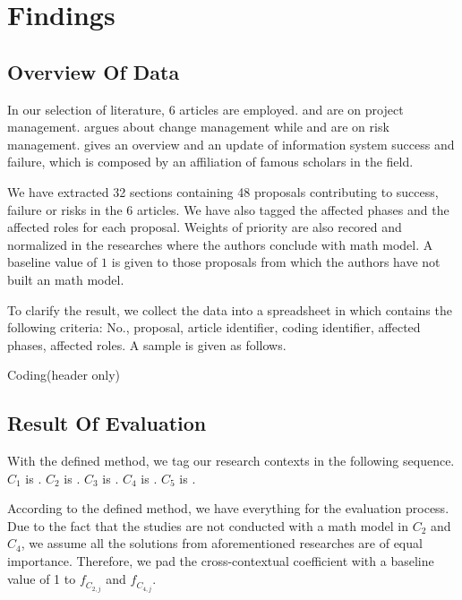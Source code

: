 
\section{Findings}

\subsection{Overview Of Data}
In our selection of literature, 6 articles are employed.  and  are on project management.  argues about change management while  and  are on risk management.  gives an overview and an update of information system success and failure, which is composed by an affiliation of famous scholars in the field.

We have extracted 32 sections containing 48 proposals contributing to success, failure or risks in the 6 articles. We have also tagged the affected phases and the affected roles for each proposal. Weights of priority are also recored and normalized in the researches where the authors conclude with math model. A baseline value of $1$ is given to those proposals from which the authors have not built an math model.


To clarify the result, we collect the data into a spreadsheet in which contains the following criteria: No., proposal, article identifier, coding identifier, affected phases, affected roles. A sample is given as follows.
\begin{table}[ht]
\caption{Coding(header only)}
\label{tab:sample}
\end{table}

\subsection{Result Of Evaluation}
With the defined method, we tag our research contexts in the following sequence.
$C_{1}$ is .
$C_{2}$ is .
$C_{3}$ is .
$C_{4}$ is .
$C_{5}$ is .

According to the defined method, we have everything for the evaluation process. Due to the fact that the studies are not conducted with a math model in $C_{2}$ and $C_{4}$, we assume all the solutions from aforementioned researches are of equal importance. Therefore, we pad the cross-contextual coefficient with a baseline value of 1 to $\mathit{f_{C_{2,j}}}$ and $\mathit{f_{C_{4,j}}}$.


